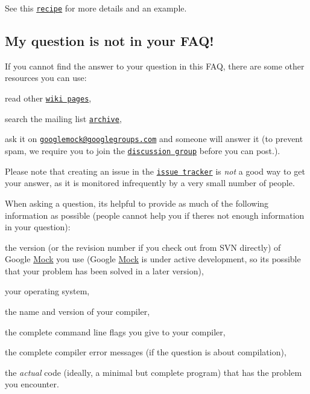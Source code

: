See this \href{http://code.google.com/p/googlemock/wiki/V1_6_CookBook#Mocking_Side_Effects}{\tt recipe} for more details and an example.

\subsection*{My question is not in your F\+A\+Q!}

If you cannot find the answer to your question in this F\+AQ, there are some other resources you can use\+:


\begin{DoxyEnumerate}
\item read other \href{http://code.google.com/p/googlemock/w/list}{\tt wiki pages},
\end{DoxyEnumerate}
\begin{DoxyEnumerate}
\item search the mailing list \href{http://groups.google.com/group/googlemock/topics}{\tt archive},
\end{DoxyEnumerate}
\begin{DoxyEnumerate}
\item ask it on \href{mailto:googlemock@googlegroups.com}{\tt googlemock@googlegroups.\+com} and someone will answer it (to prevent spam, we require you to join the \href{http://groups.google.com/group/googlemock}{\tt discussion group} before you can post.).
\end{DoxyEnumerate}

Please note that creating an issue in the \href{http://code.google.com/p/googlemock/issues/list}{\tt issue tracker} is {\itshape not} a good way to get your answer, as it is monitored infrequently by a very small number of people.

When asking a question, it\textquotesingle{}s helpful to provide as much of the following information as possible (people cannot help you if there\textquotesingle{}s not enough information in your question)\+:


\begin{DoxyItemize}
\item the version (or the revision number if you check out from S\+VN directly) of Google \hyperlink{classMock}{Mock} you use (Google \hyperlink{classMock}{Mock} is under active development, so it\textquotesingle{}s possible that your problem has been solved in a later version),
\item your operating system,
\item the name and version of your compiler,
\item the complete command line flags you give to your compiler,
\item the complete compiler error messages (if the question is about compilation),
\item the {\itshape actual} code (ideally, a minimal but complete program) that has the problem you encounter. 
\end{DoxyItemize}